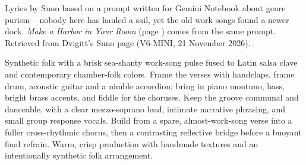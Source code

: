 
\label{sec:a-borrowed-beat}
\begin{notes}
Lyrics by Suno based on a prompt written for Gemini Notebook about genre purism -- nobody here has hauled a sail, yet the old work songs found a newer dock. \emph{Make a Harbor in Your Room} (page \pageref{sec:make-a-harbor-in-your-room}) comes from the same prompt. Retrieved from Dvigitt's Suno page (V6-MINI, 21 November 2026).
\end{notes}
\begin{style}
Synthetic folk with a brisk sea-shanty work-song pulse fused to Latin salsa clave and contemporary chamber-folk colors. Frame the verses with handclaps, frame drum, acoustic guitar and a nimble accordion; bring in piano montuno, bass, bright brass accents, and fiddle for the choruses. Keep the groove communal and danceable, with a clear mezzo-soprano lead, intimate narrative phrasing, and small group response vocals. Build from a spare, almost-work-song verse into a fuller cross-rhythmic chorus, then a contrasting reflective bridge before a buoyant final refrain. Warm, crisp production with handmade textures and an intentionally synthetic folk arrangement.
\end{style}

